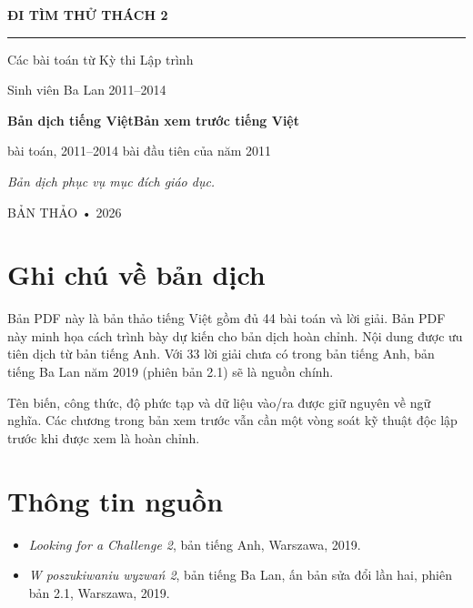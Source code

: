 \documentclass[11pt,openany]{book}
\begin{document}
\frontmatter
\begin{titlepage}
  \pagecolor{bookpaper}
  \centering
  \vspace*{18mm}
  {\sffamily\bfseries\color{bookblue}\fontsize{29}{34}\selectfont
    ĐI TÌM THỬ THÁCH 2\par}
  \vspace{5mm}
  {\color{bookteal}\rule{0.72\textwidth}{1.4pt}\par}
  \vspace{7mm}
  {\sffamily\Large Các bài toán từ Kỳ thi Lập trình\par
    Sinh viên Ba Lan 2011--2014\par}
  \vfill
  \begin{tcolorbox}[width=.82\textwidth,colback=white,colframe=bookteal,
    boxrule=.7pt,arc=2mm]
    \centering\sffamily
    \textbf{\ifdefined\FullBook Bản dịch tiếng Việt\else Bản xem trước tiếng Việt\fi}\par
    \smallskip
    \ifdefined{} bài toán, 2011--2014 bài đầu tiên của năm 2011\fi
  \end{tcolorbox}
  \vfill
  {\small\itshape Bản dịch phục vụ mục đích giáo dục.\par}
  \vspace{10mm}
  {\sffamily\color{bookgold}BẢN THẢO • 2026}
\end{titlepage}
\nopagecolor

\chapter*{Ghi chú về bản dịch}
\ifdefined\FullBook
Bản PDF này là bản thảo tiếng Việt gồm đủ 44 bài toán và lời giải.
\else
Bản PDF này minh họa cách trình bày dự kiến cho bản dịch hoàn chỉnh.
\fi
Nội dung
được ưu tiên dịch từ bản tiếng Anh. Với 33 lời giải chưa có trong bản tiếng Anh,
bản tiếng Ba Lan năm 2019 (phiên bản 2.1) sẽ là nguồn chính.

Tên biến, công thức, độ phức tạp và dữ liệu vào/ra được giữ nguyên về ngữ nghĩa.
Các chương trong bản xem trước vẫn cần một vòng soát kỹ thuật độc lập trước khi
được xem là hoàn chỉnh.

\tableofcontents

\mainmatter
\ifdefined\FullBook

\else
{}
\fi

\backmatter
\chapter*{Thông tin nguồn}
\begin{itemize}
  \item \emph{Looking for a Challenge 2}, bản tiếng Anh, Warszawa, 2019.
  \item \emph{W poszukiwaniu wyzwań 2}, bản tiếng Ba Lan, ấn bản sửa đổi lần hai,
        phiên bản 2.1, Warszawa, 2019.
\end{itemize}
\end{document}
